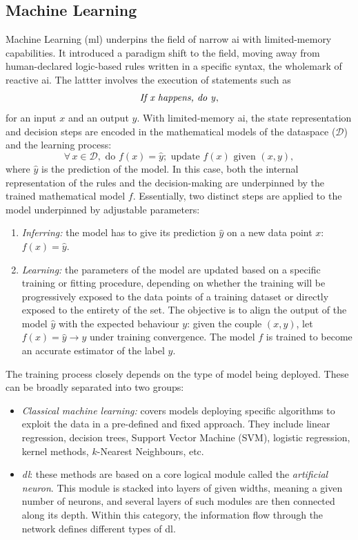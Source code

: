 \subsection{Machine Learning} 
Machine Learning (\gls{ml}) underpins the field of narrow \gls{ai} with limited-memory capabilities. It introduced a paradigm shift to the field, moving away from human-declared logic-based rules written in a specific syntax, the wholemark of reactive \gls{ai}. The lattter involves the execution of statements such as \[\textrm{\textit{If x happens, do y}},\] for an input $x$ and an output $y$. With limited-memory \gls{ai}, the state representation and decision steps are encoded in the mathematical models of the dataspace ($\mathcal{D}$) and the learning process: \[\forall\, x \in \mathcal{D}, \textrm{ do }f(x) = \hat{y}; \textrm{ update }f(x) \textrm{ given } (x, y),\] where $\hat{y}$ is the prediction of the model. In this case, both the internal representation of the rules and the decision-making are underpinned by the trained mathematical model $f$. Essentially, two distinct steps are applied to the model underpinned by adjustable parameters: 
\begin{enumerate}
    \item \textit{Inferring:} the model has to give its prediction $\hat{y}$ on a new data point $x$: $f(x) = \hat{y}$.
    \item \textit{Learning:} the parameters of the model are updated based on a specific training or fitting procedure, depending on whether the training will be progressively exposed to the data points of a training dataset or directly exposed to the entirety of the set. The objective is to align the output of the model $\hat{y}$ with the expected behaviour $y$: given the couple $(x, y)$, let $f(x) = \hat{y} \rightarrow y$ under training convergence. The model $f$ is trained to become an accurate estimator of the label $y$.
\end{enumerate}
The training process closely depends on the type of model being deployed. These can be broadly separated into two groups:
\begin{itemize}
    \item \textit{Classical machine learning:} covers models deploying specific algorithms to exploit the data in a pre-defined and fixed approach. They include linear regression, decision trees, Support Vector Machine (SVM), logistic regression, kernel methods, $k$-Nearest Neighbours, etc.
    \item \textit{\gls{dl}}: these methods are based on a core logical module called the \textit{artificial neuron}. This module is stacked into layers of given widths, meaning a given number of neurons, and several layers of such modules are then connected along its depth. Within this category, the information flow through the network defines different types of \gls{dl}.
\end{itemize}
